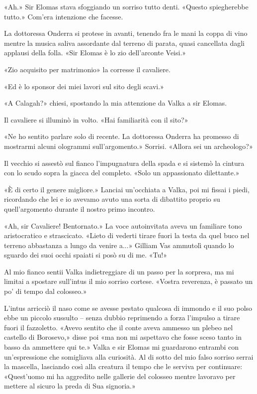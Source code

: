 «Ah.» Sir Elomas stava sfoggiando un sorriso tutto denti. «Questo
spiegherebbe tutto.» Com'era intenzione che facesse.

La dottoressa Onderra si protese in avanti, tenendo fra le mani la coppa
di vino mentre la musica saliva assordante dal terreno di parata, quasi
cancellata dagli applausi della folla. «Sir Elomas è lo zio dell'arconte
Veisi.»

«Zio acquisito per matrimonio» la corresse il cavaliere.

«Ed è lo sponsor dei miei lavori sul sito degli scavi.»

«A Calagah?» chiesi, spostando la mia attenzione da Valka a sir Elomas.

Il cavaliere si illuminò in volto. «Hai familiarità con il sito?»

«Ne ho sentito parlare solo di recente. La dottoressa Onderra ha
promesso di mostrarmi alcuni ologrammi sull'argomento.» Sorrisi. «Allora
sei un archeologo?»

Il vecchio si assestò sul fianco l'impugnatura della spada e si sistemò
la cintura con lo scudo sopra la giacca del completo. «Solo un
appassionato dilettante.»

«È di certo il genere migliore.» Lanciai un'occhiata a Valka, poi mi
fissai i piedi, ricordando che lei e io avevamo avuto una sorta di
dibattito proprio su quell'argomento durante il nostro primo incontro.

«Ah, sir Cavaliere! Bentornato.» La voce autoinvitata aveva un familiare
tono aristocratico e strascicato. «Lieto di vederti tirare fuori la
testa da quel buco nel terreno abbastanza a lungo da venire a...»
Gilliam Vas ammutolì quando lo sguardo dei suoi occhi spaiati si posò su
di me. «Tu!»

Al mio fianco sentii Valka indietreggiare di un passo per la sorpresa,
ma mi limitai a spostare sull'intus il mio sorriso cortese. «Vostra
reverenza, è passato un po' di tempo dal colosseo.»

L'intus arricciò il naso come se avesse pestato qualcosa di immondo e il
suo polso ebbe un piccolo sussulto -- senza dubbio reprimendo a forza
l'impulso a tirare fuori il fazzoletto. «Avevo sentito che il conte
aveva ammesso un plebeo nel castello di Borosevo,» disse poi «ma non mi
aspettavo che fosse sceso tanto in basso da ammettere qui te.» Valka e
sir Elomas mi guardarono entrambi con un'espressione che somigliava alla
curiosità. Al di sotto del mio falso sorriso serrai la mascella,
lasciando così alla creatura il tempo che le serviva per continuare:
«Quest'uomo mi ha aggredito nelle gallerie del colosseo mentre lavoravo
per mettere al sicuro la preda di Sua signoria.»

